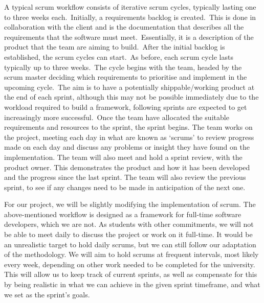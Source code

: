             A typical scrum workflow consists of iterative scrum cycles, typically lasting one to three weeks each.\
            Initially, a requirements backlog is created.\ This is done in collaboration with the client and is the
            documentation that describes all the requirements that the software must meet.\ Essentially, it is a
            description of the product that the team are aiming to build.\ After the initial backlog is established, the
            scrum cycles can start.\ As before, each scrum cycle lasts typically up to three weeks.\ The cycle begins
            with the team, headed by the scrum master deciding which requirements to prioritise and implement in the
            upcoming cycle.\ The aim is to have a potentially shippable/working product at the end of each sprint,
            although this may not be possible immediately due to the workload required to build a framework, following
            sprints are expected to get increasingly more successful.\ Once the team have allocated the suitable
            requirements and resources to the sprint, the sprint begins. The team works on the project, meeting each day
            in what are known as ‘scrums’ to review progress made on each day and discuss any problems or insight they
            have found on the implementation. The team will also meet and hold a sprint review, with the product owner.
            This demonstrates the product and how it has been developed and the progress since the last sprint. The team
            will also review the previous sprint, to see if any changes need to be made in anticipation of the next
            one.\cite{nuevo_2011_scrumbased}

            For our project, we will be slightly modifying the implementation of scrum. The above-mentioned workflow is
            designed as a framework for full-time software developers, which we are not. As students with other
            commitments, we will not be able to meet daily to discuss the project or work on it full-time. It would be an
            unrealistic target to hold daily scrums, but we can still follow our adaptation of the methodology. We will
            aim to hold scrums at frequent intervals, most likely every week, depending on other work needed to be completed for the university. This will allow
            us to keep track of current sprints, as well as compensate for this by being realistic in what we can
            achieve in the given sprint timeframe, and what we set as the sprint’s goals.

